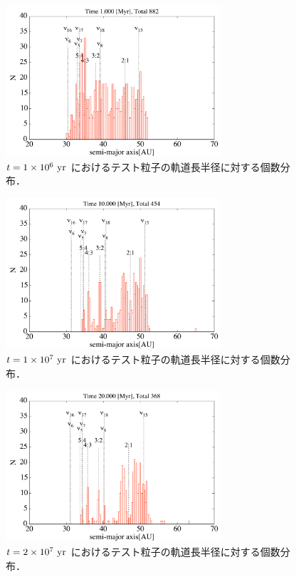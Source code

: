 \documentclass[11pt,a4paper,oneside,onecolumn]{jreport}
\begin{document}
\begin{figure}[H]
\centering
\includegraphics[width=8cm]{./image/kuiper_histogram_1Myr.pdf}
\caption{$t = 1 \times 10^6\ {\rm yr}$ におけるテスト粒子の軌道長半径に対する個数分布．\label{fig:kuiper_histogram_1Myr}}
\end{figure}

\begin{figure}[H]
\centering
\includegraphics[width=8cm]{./image/kuiper_histogram_10Myr.pdf}
\caption{$t = 1 \times 10^7\ {\rm yr}$ におけるテスト粒子の軌道長半径に対する個数分布．\label{fig:kuiper_histogram_10Myr}}
\end{figure}

\begin{figure}[H]
\centering
\includegraphics[width=8cm]{./image/kuiper_histogram_20Myr.pdf}
\caption{$t = 2 \times 10^7\ {\rm yr}$ におけるテスト粒子の軌道長半径に対する個数分布．\label{fig:kuiper_histogram_20Myr}}
\end{figure}
\end{document}
